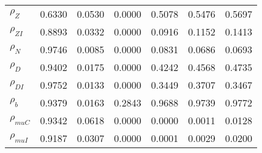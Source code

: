 \begin{center}
\begin{longtable}{lcccccc}
$ {\rho_Z}             $	 & 	          0.6330	 & 	          0.0530	 & 	          0.0000	 & 	          0.5078	 & 	          0.5476	 & 	          0.5697 \\ 
$ {\rho_{ZI}}          $	 & 	          0.8893	 & 	          0.0332	 & 	          0.0000	 & 	          0.0916	 & 	          0.1152	 & 	          0.1413 \\ 
$ {\rho_N}             $	 & 	          0.9746	 & 	          0.0085	 & 	          0.0000	 & 	          0.0831	 & 	          0.0686	 & 	          0.0693 \\ 
$ {\rho_D}             $	 & 	          0.9402	 & 	          0.0175	 & 	          0.0000	 & 	          0.4242	 & 	          0.4568	 & 	          0.4735 \\ 
$ {\rho_{DI}}          $	 & 	          0.9752	 & 	          0.0133	 & 	          0.0000	 & 	          0.3449	 & 	          0.3707	 & 	          0.3467 \\ 
$ {\rho_b}             $	 & 	          0.9379	 & 	          0.0163	 & 	          0.2843	 & 	          0.9688	 & 	          0.9739	 & 	          0.9772 \\ 
$ {\rho_{muC}}         $	 & 	          0.9342	 & 	          0.0618	 & 	          0.0000	 & 	          0.0000	 & 	          0.0011	 & 	          0.0128 \\ 
$ {\rho_{muI}}         $	 & 	          0.9187	 & 	          0.0307	 & 	          0.0000	 & 	          0.0001	 & 	          0.0029	 & 	          0.0200 \\ 
\end{longtable}
 \end{center}
